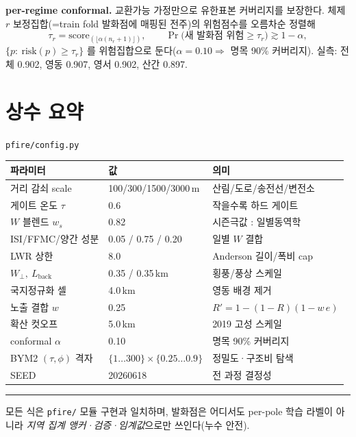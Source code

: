 \documentclass[11pt,a4paper]{article}
\newcommand{\src}[1]{{\footnotesize\color{gray}\texttt{#1}}}
\begin{document}
\textbf{per-regime conformal.} 교환가능 가정만으로 유한표본 커버리지를 보장한다. 체제 $r$
보정집합(=train fold 발화점에 매핑된 전주)의 위험점수를 오름차순 정렬해
\begin{equation}
\tau_r=\mathrm{score}_{(\lfloor\alpha(n_r+1)\rfloor)},\qquad
\Pr\!\big(\text{새 발화점 위험}\ge\tau_r\big)\gtrsim 1-\alpha,
\end{equation}
$\{p:\ \mathrm{risk}(p)\ge\tau_r\}$ 를 위험집합으로 둔다($\alpha=0.10\Rightarrow$ 명목 90\%
커버리지). 실측: 전체 0.902, 영동 0.907, 영서 0.902, 산간 0.897.

\section{상수 요약}
\src{pfire/config.py}

\begin{tabular}{lll}
\toprule
파라미터 & 값 & 의미 \\
\midrule
거리 감쇠 scale & 100/300/1500/3000\,m & 산림/도로/송전선/변전소 \\
게이트 온도 $\tau$ & 0.6 & 작을수록 하드 게이트 \\
$W$ 블렌드 $w_s$ & 0.82 & 시즌극값 : 일별동역학 \\
ISI/FFMC/양간 성분 & 0.05 / 0.75 / 0.20 & 일별 $W$ 결합 \\
LWR 상한 & 8.0 & Anderson 길이/폭비 cap \\
$W_\perp,\ L_{\text{back}}$ & 0.35 / 0.35\,km & 횡풍/풍상 스케일 \\
국지정규화 셀 & 4.0\,km & 영동 배경 제거 \\
노출 결합 $w$ & 0.25 & $R'=1-(1-R)(1-w\,e)$ \\
확산 컷오프 & 5.0\,km & 2019 고성 스케일 \\
conformal $\alpha$ & 0.10 & 명목 90\% 커버리지 \\
BYM2 $(\tau,\phi)$ 격자 & $\{1{\dots}300\}\times\{0.25{\dots}0.9\}$ & 정밀도·구조비 탐색 \\
SEED & 20260618 & 전 과정 결정성 \\
\bottomrule
\end{tabular}

\vspace{8pt}\hrule\vspace{4pt}
{\footnotesize 모든 식은 \texttt{pfire/} 모듈 구현과 일치하며, 발화점은 어디서도
per-pole 학습 라벨이 아니라 \emph{지역 집계 앵커·검증·임계값}으로만 쓰인다(누수 안전).}
\end{document}
